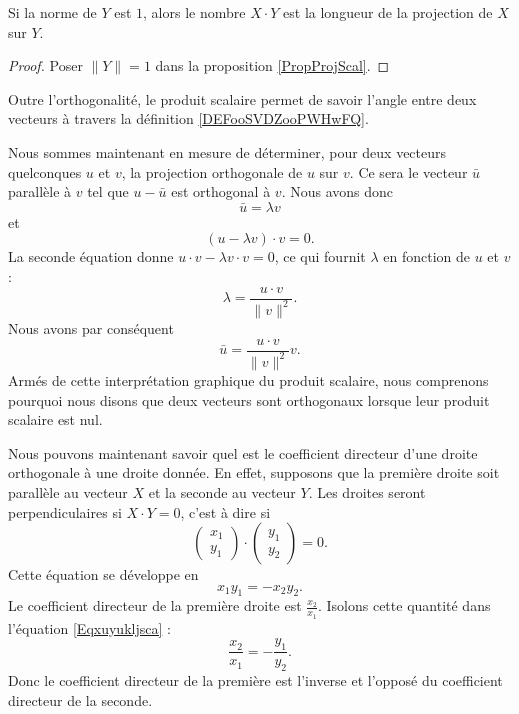 \begin{corollary}
	Si la norme de $Y$ est $1$, alors le nombre $X\cdot Y$ est la longueur de la projection de $X$ sur $Y$.
\end{corollary}

\begin{proof}
	Poser $\| Y \|=1$ dans la proposition \ref{PropProjScal}.
\end{proof}

\begin{remark}
    Outre l'orthogonalité, le produit scalaire permet de savoir l'angle entre deux vecteurs à travers la définition \ref{DEFooSVDZooPWHwFQ}.
\end{remark}

Nous sommes maintenant en mesure de déterminer, pour deux vecteurs quelconques $u$ et $v$, la projection orthogonale de $u$ sur $v$. Ce sera le vecteur $\bar u$ parallèle à $v$ tel que $u-\bar u$ est orthogonal à $v$. Nous avons donc
\begin{equation}
    \bar u=\lambda v
\end{equation}
et 
\begin{equation}
    (u-\lambda v)\cdot v=0.
\end{equation}
La seconde équation donne $u\cdot v-\lambda v\cdot v=0$, ce qui fournit $\lambda$ en fonction de $u$ et $v$ :
\begin{equation}
    \lambda=\frac{ u\cdot v }{ \| v \|^2 }.
\end{equation}
Nous avons par conséquent
\begin{equation}
    \bar u=\frac{ u\cdot v }{ \| v \|^2 }v.
\end{equation}
Armés de cette interprétation graphique du produit scalaire, nous comprenons pourquoi nous disons que deux vecteurs sont orthogonaux lorsque leur produit scalaire est nul.

Nous pouvons maintenant savoir quel est le coefficient directeur d'une droite orthogonale à une droite donnée. En effet, supposons que la première droite soit parallèle au vecteur $X$ et la seconde au vecteur $Y$. Les droites seront perpendiculaires si $X\cdot Y=0$, c'est à dire si
\begin{equation}
	\begin{pmatrix}
		x_1	\\ 
		y_1	
	\end{pmatrix}\cdot\begin{pmatrix}
		y_1	\\ 
		y_2	
	\end{pmatrix}=0.
\end{equation}
Cette équation se développe en 
\begin{equation}		\label{Eqxuyukljsca}
	x_1y_1=-x_2y_2.
\end{equation}
Le coefficient directeur de la première droite est $\frac{ x_2 }{ x_1 }$. Isolons cette quantité dans l'équation \eqref{Eqxuyukljsca} :
\begin{equation}
	\frac{ x_2 }{ x_1 }=-\frac{ y_1 }{ y_2 }.
\end{equation}
Donc le coefficient directeur de la première est l'inverse et l'opposé du coefficient directeur de la seconde.

